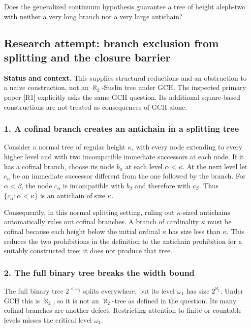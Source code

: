 \documentclass[11pt,a4paper]{article}
\begin{document}
Does the generalized continuum hypothesis guarantee a tree of height aleph-two with neither a very long branch nor a very large antichain?

\subsection{Research attempt: branch exclusion from splitting and the closure barrier}
\textbf{Status and context.} This supplies structural reductions and an obstruction to a naive construction, not an $\aleph_2$-Suslin tree under GCH. The inspected primary paper [R1] explicitly asks the same GCH question. Its additional square-based constructions are not treated as consequences of GCH alone.

\subsubsection{1. A cofinal branch creates an antichain in a splitting tree}
Consider a normal tree of regular height $\kappa$, with every node extending to every higher level and with two incompatible immediate successors at each node. If it has a cofinal branch, choose its node $b_\alpha$ at each level $\alpha<\kappa$. At the next level let $c_\alpha$ be an immediate successor different from the one followed by the branch. For $\alpha<\beta$, the node $c_\alpha$ is incompatible with $b_\beta$ and therefore with $c_\beta$. Thus $\{c_\alpha:\alpha<\kappa\}$ is an antichain of size $\kappa$.

Consequently, in this normal splitting setting, ruling out $\kappa$-sized antichains automatically rules out cofinal branches. A branch of cardinality $\kappa$ must be cofinal because each height below the initial ordinal $\kappa$ has size less than $\kappa$. This reduces the two prohibitions in the definition to the antichain prohibition for a suitably constructed tree; it does not produce that tree.

\subsubsection{2. The full binary tree breaks the width bound}
The full binary tree $2^{<\omega_2}$ splits everywhere, but its level $\omega_1$ has size $2^{\aleph_1}$. Under GCH this is $\aleph_2$, so it is not an $\aleph_2$-tree as defined in the question. Its many cofinal branches are another defect. Restricting attention to finite or countable levels misses the critical level $\omega_1$.
\end{document}
